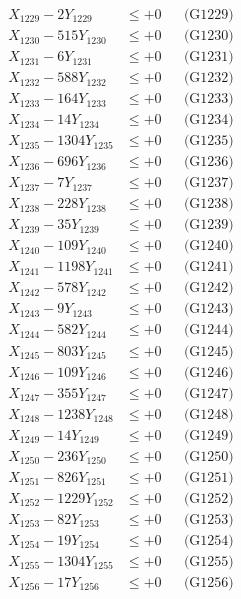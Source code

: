 \documentclass[a4paper,10pt]{article}
\begin{document}
{\begin{align}
X_{1229} - 2Y_{1229} &\leq +0 && \text{(G1229)} \\
X_{1230} - 515Y_{1230} &\leq +0 && \text{(G1230)} \\
\allowbreak
X_{1231} - 6Y_{1231} &\leq +0 && \text{(G1231)} \\
X_{1232} - 588Y_{1232} &\leq +0 && \text{(G1232)} \\
X_{1233} - 164Y_{1233} &\leq +0 && \text{(G1233)} \\
X_{1234} - 14Y_{1234} &\leq +0 && \text{(G1234)} \\
X_{1235} - 1304Y_{1235} &\leq +0 && \text{(G1235)} \\
X_{1236} - 696Y_{1236} &\leq +0 && \text{(G1236)} \\
X_{1237} - 7Y_{1237} &\leq +0 && \text{(G1237)} \\
X_{1238} - 228Y_{1238} &\leq +0 && \text{(G1238)} \\
X_{1239} - 35Y_{1239} &\leq +0 && \text{(G1239)} \\
X_{1240} - 109Y_{1240} &\leq +0 && \text{(G1240)} \\
\allowbreak
X_{1241} - 1198Y_{1241} &\leq +0 && \text{(G1241)} \\
X_{1242} - 578Y_{1242} &\leq +0 && \text{(G1242)} \\
X_{1243} - 9Y_{1243} &\leq +0 && \text{(G1243)} \\
X_{1244} - 582Y_{1244} &\leq +0 && \text{(G1244)} \\
X_{1245} - 803Y_{1245} &\leq +0 && \text{(G1245)} \\
X_{1246} - 109Y_{1246} &\leq +0 && \text{(G1246)} \\
X_{1247} - 355Y_{1247} &\leq +0 && \text{(G1247)} \\
X_{1248} - 1238Y_{1248} &\leq +0 && \text{(G1248)} \\
X_{1249} - 14Y_{1249} &\leq +0 && \text{(G1249)} \\
X_{1250} - 236Y_{1250} &\leq +0 && \text{(G1250)} \\
\allowbreak
X_{1251} - 826Y_{1251} &\leq +0 && \text{(G1251)} \\
X_{1252} - 1229Y_{1252} &\leq +0 && \text{(G1252)} \\
X_{1253} - 82Y_{1253} &\leq +0 && \text{(G1253)} \\
X_{1254} - 19Y_{1254} &\leq +0 && \text{(G1254)} \\
X_{1255} - 1304Y_{1255} &\leq +0 && \text{(G1255)} \\
X_{1256} - 17Y_{1256} &\leq +0 && \text{(G1256)} \\

\end{align}}
\end{document}
